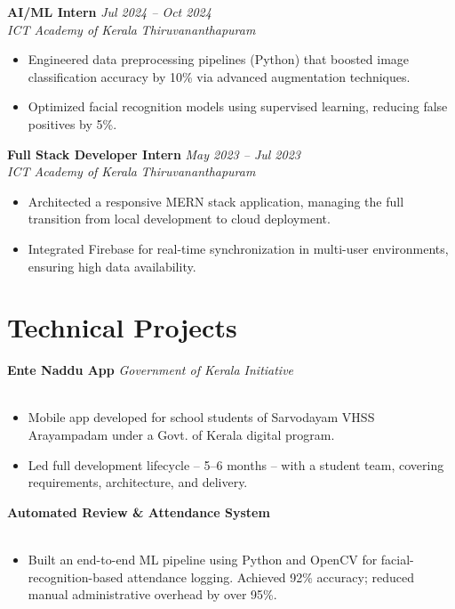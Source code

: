 \documentclass[10pt,a4paper]{article}
\newcommand{\jobheading}[4]{
  \noindent\textbf{#1} \hfill \textit{#2} \\
  \noindent\textit{#3} \hfill \textit{#4} \\
  \vspace{-4pt}
}
\newcommand{\projectheading}[3]{
  \noindent\textbf{#1} \hfill \textit{#2} \\
  \noindent\textit{#3} \\
  \vspace{-4pt}
}
\begin{document}
\vspace{5pt}

\jobheading{AI/ML Intern}{Jul 2024 -- Oct 2024}{ICT Academy of Kerala}{Thiruvananthapuram}
\begin{itemize}[label={$\bullet$}]
    \item Engineered data preprocessing pipelines (Python) that boosted image classification accuracy by 10\% via advanced augmentation techniques.
    \item Optimized facial recognition models using supervised learning, reducing false positives by 5\%.
\end{itemize}

\vspace{5pt}

\jobheading{Full Stack Developer Intern}{May 2023 -- Jul 2023}{ICT Academy of Kerala}{Thiruvananthapuram}
\begin{itemize}[label={$\bullet$}]
    \item Architected a responsive MERN stack application, managing the full transition from local development to cloud deployment.
    \item Integrated Firebase for real-time synchronization in multi-user environments, ensuring high data availability.
\end{itemize}

\section*{Technical Projects}

\projectheading{Ente Naddu App}{Government of Kerala Initiative}{}
\begin{itemize}[label={$\bullet$}]
    \item Mobile app developed for school students of Sarvodayam VHSS Arayampadam under a Govt. of Kerala digital program.
    \item Led full development lifecycle -- 5--6 months -- with a student team, covering requirements, architecture, and delivery.
\end{itemize}

\vspace{4pt}

\projectheading{Automated Review \& Attendance System}{}{}
\begin{itemize}[label={$\bullet$}]
    \item Built an end-to-end ML pipeline using Python and OpenCV for facial-recognition-based attendance logging. Achieved 92\% accuracy; reduced manual administrative overhead by over 95\%.
\end{itemize}
\end{document}
